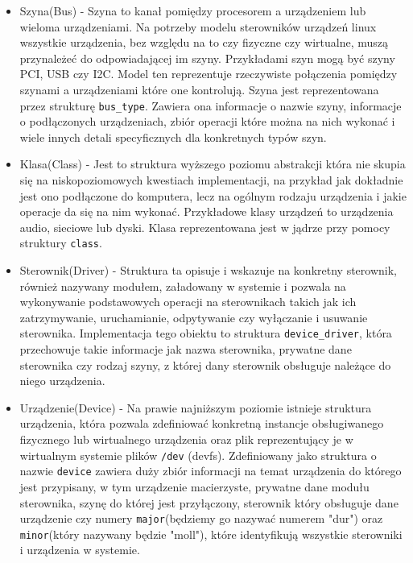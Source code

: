 \documentclass[10pt]{scrartcl}
\begin{document}
\begin{itemize}
\item
  Szyna(Bus) - Szyna to kanał pomiędzy procesorem a urządzeniem lub wieloma urządzeniami. Na potrzeby modelu sterowników urządzeń linux wszystkie urządzenia, bez względu na to czy fizyczne czy wirtualne, muszą przynależeć do odpowiadającej im szyny. Przykładami szyn mogą być szyny PCI, USB czy I2C. Model ten reprezentuje rzeczywiste połączenia pomiędzy szynami a urządzeniami które one kontrolują. Szyna jest reprezentowana przez strukturę \texttt{bus\_type}. Zawiera ona informacje o nazwie szyny, informacje o podłączonych urządzeniach, zbiór operacji które można na nich wykonać i wiele innych detali specyficznych dla konkretnych typów szyn.
\item
  Klasa(Class) - Jest to struktura wyższego poziomu abstrakcji która nie skupia się na niskopoziomowych kwestiach implementacji, na przykład jak dokładnie jest ono podłączone do komputera, lecz na ogólnym rodzaju urządzenia i jakie operacje da się na nim wykonać. Przykładowe klasy urządzeń to urządzenia audio, sieciowe lub dyski. Klasa reprezentowana jest w jądrze przy pomocy struktury \texttt{class}.
\item
  Sterownik(Driver) - Struktura ta opisuje i wskazuje na konkretny sterownik, również nazywany modułem, załadowany w systemie i pozwala na wykonywanie podstawowych operacji na sterownikach takich jak ich zatrzymywanie, uruchamianie, odpytywanie czy wyłączanie i usuwanie sterownika. Implementacja tego obiektu to struktura \texttt{device\_driver}, która przechowuje takie informacje jak nazwa sterownika, prywatne dane sterownika czy rodzaj szyny, z której dany sterownik obsługuje należące do niego urządzenia.
\item
  Urządzenie(Device) - Na prawie najniższym poziomie istnieje struktura urządzenia, która pozwala zdefiniować konkretną instancje obsługiwanego fizycznego lub wirtualnego urządzenia oraz plik reprezentujący je w wirtualnym systemie plików \texttt{/dev} (devfs).  Zdefiniowany jako struktura o nazwie \texttt{device} zawiera duży zbiór informacji na temat urządzenia do którego jest przypisany, w tym urządzenie macierzyste, prywatne dane modułu sterownika, szynę do której jest przyłączony, sterownik który obsługuje dane urządzenie czy numery \texttt{major}(będziemy go nazywać numerem "dur") oraz \texttt{minor}(który nazywany będzie "moll"), które identyfikują wszystkie sterowniki i urządzenia w systemie.
\end{itemize}
\end{document}
